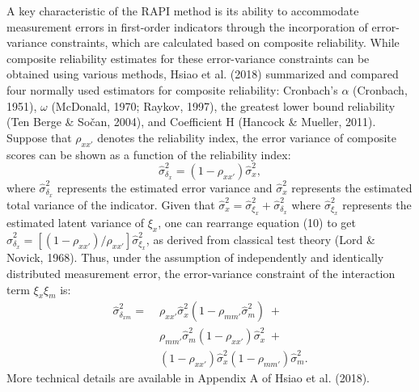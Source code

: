 \documentclass[
  man]{apa6}
\begin{document}
A key characteristic of the RAPI method is its ability to accommodate measurement errors in first-order indicators through the incorporation of error-variance constraints, which are calculated based on composite reliability. While composite reliability estimates for these error-variance constraints can be obtained using various methods, Hsiao et al. (2018) summarized and compared four normally used estimators for composite reliability: Cronbach's \(\alpha\) (Cronbach, 1951), \(\omega\) (McDonald, 1970; Raykov, 1997), the greatest lower bound reliability (Ten Berge \& Sočan, 2004), and Coefficient H (Hancock \& Mueller, 2011). Suppose that \(\rho_{xx'}\) denotes the reliability index, the error variance of composite scores can be shown as a function of the reliability index:
\begin{equation}
\hat{\sigma}^2_{\delta_{x}} = (1 - \rho_{xx'})\hat{\sigma}^2_{{x}},
\end{equation}
where \(\hat{\sigma}^2_{\delta_{x}}\) represents the estimated error variance and \(\hat{\sigma}^2_{{x}}\) represents the estimated total variance of the indicator. Given that \(\hat{\sigma}^2_{{x}} = {\hat{\sigma}^2_{\xi_{x}} + \hat{\sigma}^2_{\delta_{x}}}\) where \(\hat{\sigma}^2_{\xi_{x}}\) represents the estimated latent variance of \(\xi_{x}\), one can rearrange equation (10) to get \(\hat{\sigma}_{\delta_{x}}^2 = [(1 - \rho_{xx'})/{\rho_{xx'}}]\hat{\sigma}^2_{\xi_{x}}\), as derived from classical test theory (Lord \& Novick, 1968). Thus, under the assumption of independently and identically distributed measurement error, the error-variance constraint of the interaction term \(\xi_{x}\xi_{m}\) is:
\begin{equation}
\begin{aligned}
\hat{\sigma}^2_{\delta_{xm}} =\; & \rho_{xx'}\hat{\sigma}^2_{{x}}(1 - \rho_{mm'}\hat{\sigma}^2_{{m}})\; + \\&
                        \rho_{mm'}\hat{\sigma}^2_{{m}}(1-\rho_{xx'})\hat{\sigma}^2_{{x}}\; + \\&
                        (1 - \rho_{xx'})\hat{\sigma}^2_{{x}}(1 - \rho_{mm'})\hat{\sigma}^2_{{m}}. 
\end{aligned}
\end{equation}
More technical details are available in Appendix A of Hsiao et al. (2018).
\end{document}
